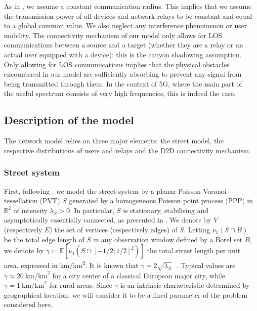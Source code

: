 \documentclass[conference]{IEEEtran}
\begin{document}
\indent As in \cite{glauche_continuum_2003}, we assume a constant communication radius. This implies that we assume the transmission power of all devices and network relays to be constant and equal to a global common value. We also neglect any interference phenomenon or user mobility. %
The connectivity mechanism 
of our model only allows for LOS communications between a source and a target (whether they are a relay or an actual user equipped with a device): this is the canyon shadowing assumption. %
Only allowing for LOS communications implies that the physical obstacles encountered in our model are sufficiently absorbing to prevent any signal from being transmitted through them. In the context of 5G, where the main part of the useful spectrum consists of very high frequencies, this is indeed the case. %

\subsection{Description of the model}
The network model relies on three major elements: the street model, the respective distributions of users and relays and the D2D connectivity mechanism. \\
\subsubsection{Street system}
\indent First, following %
\cite{gloaguen2006fitting}, we model the street system by a planar Poisson-Voronoi tessellation (PVT) $S$ generated by a homogeneous Poisson point process (PPP) in $\mathbb{R}^{2}$ of intensity $\lambda_{S} > 0$. In particular, $S$ is stationary, stabilising and asymptotically essentially connected, as presented in \cite{hirsch_continuum_2017}. We denote by $V$ (respectively $E$) the set of vertices (respectively edges) of $S$. Letting $\nu_{1}(S \cap B)$ be the total edge length of $S$ in any observation window defined by a Borel set $B$, we  denote by $\gamma \coloneqq \mathbb{E}\left[\nu_{1}\left(S \cap \left[-1/2;1/2\right]^{2}\right)\right]$ the total street length per unit area, expressed in km/km\textsuperscript{2}. It is  known that $\gamma = 2\sqrt{\lambda_{S}}$\,~\cite{moller_lectures_2012}. Typical values are $\gamma \approx 20 \: \text{km/km}^{2}$ for a city center of a classical European major city, while $\gamma = 1  \: \text{km/km}^{2}$ for rural areas.
Since $\gamma$ is an intrinsic characteristic determined by geographical location, we will consider it to be a fixed parameter of the problem considered here.  \\ %
\end{document}
